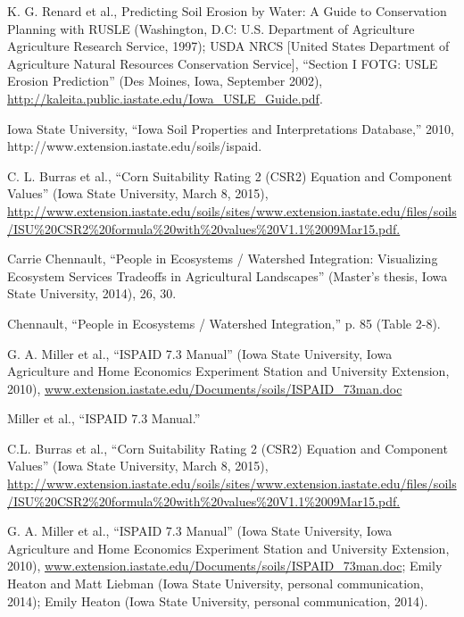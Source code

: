 \documentclass[11pt]{article}
\begin{document}
\begin{thebibliography}{1}

   K. G. Renard et al., Predicting Soil Erosion by Water: A Guide to Conservation Planning with RUSLE (Washington, D.C: U.S. Department of Agriculture Agriculture Research Service, 1997); USDA NRCS [United States Department of Agriculture Natural Resources Conservation Service], “Section I FOTG: USLE Erosion Prediction” (Des Moines, Iowa, September 2002), \url{http://kaleita.public.iastate.edu/Iowa_USLE_Guide.pdf}.
  
  Iowa State University, “Iowa Soil Properties and Interpretations Database,” 2010, http://www.extension.iastate.edu/soils/ispaid.
  
  C. L. Burras et al., “Corn Suitability Rating 2 (CSR2) Equation and Component Values” (Iowa State University, March 8, 2015), \url{http://www.extension.iastate.edu/soils/sites/www.extension.iastate.edu/files/soils/ISU\%20CSR2\%20formula\%20with\%20values\%20V1.1\%2009Mar15.pdf.}
  
  Carrie Chennault, “People in Ecosystems / Watershed Integration: Visualizing Ecosystem Services Tradeoffs in Agricultural Landscapes” (Master’s thesis, Iowa State University, 2014), 26, 30.
  
  Chennault, “People in Ecosystems / Watershed Integration,” p. 85 (Table 2-8).
  
  G. A. Miller et al., “ISPAID 7.3 Manual” (Iowa State University, Iowa Agriculture and Home Economics Experiment Station and University Extension, 2010), \url{www.extension.iastate.edu/Documents/soils/ISPAID_73man.doc}
  
  Miller et al., “ISPAID 7.3 Manual.”
  
  C.L. Burras et al., “Corn Suitability Rating 2 (CSR2) Equation and Component Values” (Iowa State University, March 8, 2015), \url{http://www.extension.iastate.edu/soils/sites/www.extension.iastate.edu/files/soils/ISU\%20CSR2\%20formula\%20with\%20values\%20V1.1\%2009Mar15.pdf.}
  
   G. A. Miller et al., “ISPAID 7.3 Manual” (Iowa State University, Iowa Agriculture and Home Economics Experiment Station and University Extension, 2010), \url{www.extension.iastate.edu/Documents/soils/ISPAID_73man.doc}; Emily Heaton and Matt Liebman (Iowa State University, personal communication, 2014); Emily Heaton (Iowa State University, personal communication, 2014).
  

\end{thebibliography}
\end{document}
